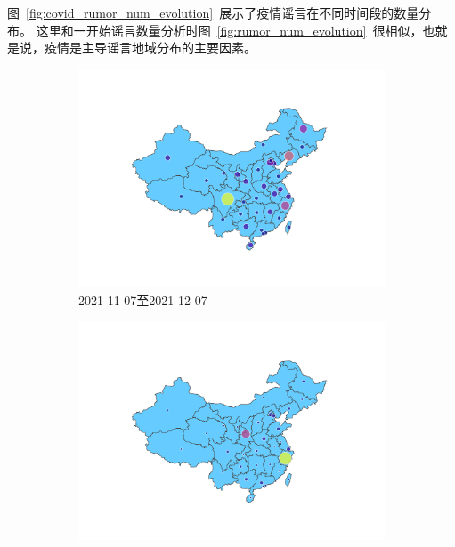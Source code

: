 \documentclass[UTF8]{ctexart}
\begin{document}
图~\ref{fig:covid_rumor_num_evolution}~展示了疫情谣言在不同时间段的数量分布。
这里和一开始谣言数量分析时图~\ref{fig:rumor_num_evolution}~很相似，也就是说，疫情是主导谣言地域分布的主要因素。

\begin{figure}[!ht]
    \begin{subfigure}[b]{0.3\textwidth}
         \centering
         \includegraphics[width=\textwidth]{../figures/covid_rumor_num_choropleth_0}
         \caption{2021-11-07至2021-12-07}
         \label{subfig:covid_rumor_num_choropleth_0}
     \end{subfigure}
     \hfill
     \begin{subfigure}[b]{0.3\textwidth}
         \centering
         \includegraphics[width=\textwidth]{../figures/covid_rumor_num_choropleth_1}

\end{subfigure}
\end{figure}
\end{document}
